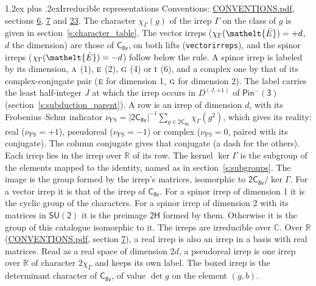 \documentclass[10pt,a4paper]{article}
\makeatletter
\renewcommand\section{\@startsection{section}{1}{\z@}{-3ex plus -1ex minus -.2ex}%
  {1.2ex plus .2ex}{\normalfont\large\sffamily\bfseries\color{parttitle}}}
\numberwithin{equation}{section}
\newcommand{\eltfont}[1]{{\let\sigma\eltsigma\mathelt{#1}}}
\newcommand{\grp}[1]{\mathsf{#1}}
\newcommand{\irr}[1]{\text{\normalfont\scshape #1}}
\newcommand{\elt}[1]{\eltfont{#1}}
\newcommand{\irrJp}[2]{D^{(#1,#2)}}
\newcommand{\irchar}[1]{\chi_{#1}}
\newcommand{\fsind}{\nu_{\mathrm{FS}}}
\newcommand{\barred}[1]{\bar{#1}}
\makeatother
\begin{document}
\section{Irreducible representations}\label{s:irreps}
Conventions: \href{../../CONVENTIONS.pdf}{CONVENTIONS.pdf}, sections \href{../../../rotation/CONVENTIONS.pdf\#conv.6}{6}, \href{../../../rotation/CONVENTIONS.pdf\#conv.7}{7} and \href{../../CONVENTIONS.pdf\#conv.23}{23}.
\leavevmode\label{n:function.character}\label{n:irrep.Gamma}The character $\irchar{\Gamma}(g)$ of the irrep $\Gamma$ on the class of $g$ is given in section~\ref{s:character_table}. \label{n:index.dimension}The vector irreps ($\irchar{\Gamma}(\elt{\barred{E}}) = +d$, $d$ the dimension) are those of \href{../../../rotation/data/pdf/C8v.pdf}{$\grp{C_{8v}}$}, on both lifts (\texttt{vectorirreps}), and the spinor irreps ($\irchar{\Gamma}(\elt{\barred{E}}) = -d$) follow below the rule. A spinor irrep is labeled by its dimension, $\irr{a}$ (1), $\irr{e}$ (2), $\irr{g}$ (4) or $\irr{i}$ (6), and a complex one by that of its complex-conjugate pair ($\irr{e}$ for dimension 1, $\irr{g}$ for dimension 2). The label carries the least half-integer $J$ at which the irrep occurs in $\irrJp{J}{+1}$ of $\grp{Pin^{-}(3)}$ (section~\ref{s:subduction_parent}).
\leavevmode\label{n:index.frobenius}\label{n:head.irrep}\label{n:head.reality}A row is an irrep of dimension $d$, with its Frobenius--Schur indicator $\fsind = |\grp{2C_{8v}}|^{-1}\allowbreak\sum_{g\in\grp{2C_{8v}}}\irchar{\Gamma}(g^2)$, which gives its reality: real ($\fsind = +1$), pseudoreal ($\fsind = -1$) or complex ($\fsind = 0$, paired with its conjugate). \label{n:head.conjugate}The column conjugate gives that conjugate (a dash for the others). \label{n:head.over.real}Each irrep lies in the irrep over $\mathbb{R}$ of its row. \label{n:head.kernel}The kernel $\ker\Gamma$ is the subgroup of the elements mapped to the identity, named as in section~\ref{s:subgroups}. \label{n:head.image}The image is the group formed by the irrep's matrices, isomorphic to $\grp{2C_{8v}}/\ker\Gamma$. For a vector irrep it is that of the irrep of \href{../../../rotation/data/pdf/C8v.pdf}{$\grp{C_{8v}}$}. For a spinor irrep of dimension 1 it is the cyclic group of the characters. For a spinor irrep of dimension 2 with its matrices in $\grp{SU(2)}$ it is the preimage $\grp{2H}$ formed by them. Otherwise it is the group of this catalogue isomorphic to it. The irreps are irreducible over $\mathbb{C}$. Over $\mathbb{R}$ (\href{../../CONVENTIONS.pdf}{CONVENTIONS.pdf}, section \href{../../../rotation/CONVENTIONS.pdf\#conv.7}{7}), a real irrep is also an irrep in a basis with real matrices. Read as a real space of dimension $2d$, a pseudoreal irrep is one irrep over $\mathbb{R}$ of character $2\irchar{\Gamma}$ and keeps its own label. \label{n:mark.determinant}The boxed irrep is the determinant character of \href{../../../rotation/data/pdf/C8v.pdf}{$\grp{C_{8v}}$}, of value $\det g$ on the element $(g, b)$.
\end{document}
